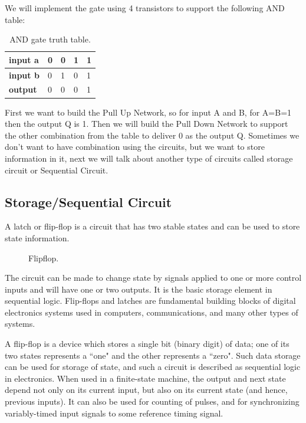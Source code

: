 We will implement the gate using 4 transistors to support the following AND table:

\begin{table}[!ht]
    \centering
    \caption{AND gate truth table.}
    \begin{tabular}{lllll}
        \toprule
        \textbf{input a} & 0 & 0 & 1 & 1 \\ \midrule
        \textbf{input b} & 0 & 1 & 0 & 1 \\ \midrule
        \textbf{output}  & 0 & 0 & 0 & 1 \\ \bottomrule
    \end{tabular}
\end{table}

First we want to build the Pull Up Network, so for input A and B, for A=B=1 then the output Q is 1.
Then we will build the Pull Down Network to support the other combination from the table to deliver 0 as the output Q. Sometimes we don't want to have combination using the circuits, but we want to store information in it, next we will talk about another type of circuits called storage circuit or Sequential Circuit.

\subsection{ Storage/Sequential Circuit }

A latch or flip-flop is a circuit that has two stable states and can be used to store state information. 
\begin{figure}[!ht]
    \centering
    
    \caption{Flipflop.} \label{fig:flipflop}
\end{figure}

The circuit can be made to change state by signals applied to one or more control inputs and will have one or two outputs. It is the basic storage element in sequential logic. Flip-flops and latches are fundamental building blocks of digital electronics systems used in computers, communications, and many other types of systems.

A flip-flop is a device which stores a single bit (binary digit) of data; one of its two states represents a ``one" and the other represents a ``zero". Such data storage can be used for storage of state, and such a circuit is described as sequential logic in electronics. When used in a finite-state machine, the output and next state depend not only on its current input, but also on its current state (and hence, previous inputs). It can also be used for counting of pulses, and for synchronizing variably-timed input signals to some reference timing signal.

